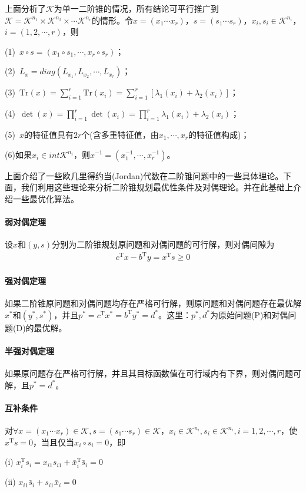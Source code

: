         \par
        上面分析了$\mathcal{K}$为单一二阶锥的情况，所有结论可平行推广到$\mathcal{K}=\mathcal{K}^{n_1}\times \mathcal{K}^{n_2}\times\cdots \mathcal{K}^{n_r}$的情形。令$x=(x_1\cdots x_r)$，$s=(s_1\cdots s_r)$，$x_i,s_i\in \mathcal{K}^{n_i}$，$i=(1,2,\cdots,r)$，则\par
        (1)\ $x\circ s=(x_1\circ s_1,\cdots,x_r\circ s_r)$；\par
        (2)\ $L_x=diag(L_{x_1},L_{x_2},\cdots,L_{x_r})$；\par
        (3)\ $\mathrm{Tr}(x)=\mathop {\sum}\limits_{i=1}^r \mathrm{Tr}(x_i)=\mathop {\sum}\limits_{i=1}^r[{\lambda}_1(x_i)+{\lambda}_2(x_i)]$；\par
        (4)\ $\det(x)=\mathop {\prod}\limits_{i=1}^r \det(x_i)=\mathop {\prod}\limits_{i=1}^r{\lambda}_1(x_i)+{\lambda}_2(x_i)$；\par
        (5)\ $x$的特征值具有$2r$个(含多重特征值，由$x_1,\cdots,x_r$的特征值构成)；\par
        (6)如果$x_i \in int \mathcal{K}^{n_i}$，则$x^{-1}=(x_1^{-1},\cdots,x_r^{-1})$。
        \par
        上面介绍了一些欧几里得约当(Jordan)代数在二阶锥问题中的一些具体理论。下面，我们利用这些理论来分析二阶锥规划最优性条件及对偶理论。并在此基础上介绍一些最优化算法。
        \paragraph{弱对偶定理}设$x$和$(y,s)$分别为二阶锥规划原问题和对偶问题的可行解，则对偶间隙为
        \begin{align*}
           c^\mathrm{T} x-b^\mathrm{T} y=x^\mathrm{T} s \geqslant 0
        \end{align*}
        \paragraph{强对偶定理}如果二阶锥原问题和对偶问题均存在严格可行解，则原问题和对偶问题存在最优解$x^*$和$(y^*,s^*)$，并且$p^*=c^\mathrm{T} x^*=b^\mathrm{T} y^*=d^*$。这里：$p^*,d^*$为原始问题(P)和对偶问题(D)的最优解。
        \paragraph{半强对偶定理}如果原问题存在严格可行解，并且其目标函数值在可行域内有下界，则对偶问题可解，且$p^*=d^*$。
        \paragraph{互补条件}对$\forall x=(x_1\cdots x_r) \in \mathcal{K},s=(s_1\cdots s_r) \in \mathcal{K} $，$x_i \in \mathcal{K}^{n_i},s_i \in \mathcal{K}^{n_i},i=1,2,\cdots,r$，使$x^\mathrm{T} s=0$，当且仅当$x_i\circ s_i=0$，即
        \par
        (i) $x_i^\mathrm{T} s_i=x_{i1}s_{i1}+{\bar{x}}_i^\mathrm{T} {\bar{s}}_i=0$\par
        (ii) $x_{i1}{\bar{s}}_i+s_{i1}{\bar{x}}_i=0$
